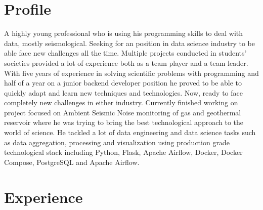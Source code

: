\documentclass[11pt,a4paper,sans]{moderncv}
\begin{document}
\makecvtitle
\vspace{-0.9cm}


\section{Profile}
	A highly young professional who is using his programming skills to deal with data, mostly seismological. Seeking for an position in data science industry to be able face new challenges all the time. Multiple projects conducted in students' societies provided a lot of experience both as a team player and a team leader.
	With five years of experience in solving scientific problems with programming and half of a year on a junior backend developer position he proved to be able to quickly adapt and learn new techniques and technologies. Now, ready to face completely new challenges in either industry.
	Currently finished working on project focused on Ambient Seismic Noise monitoring of gas and geothermal reservoir where he was trying to bring the best technological approach to the world of science. He tackled a lot of data engineering and data science tasks such as data aggregation, processing and visualization using production grade technological stack including Python, Flask, Apache Airflow, Docker, Docker Compose, PostgreSQL and Apache Airflow. 

\section{Experience}
	\vspace{-0.1cm}
	\vspace{-0.1cm}

	\vspace{-0.1cm}
	\vspace{-0.1cm}
\end{document}
